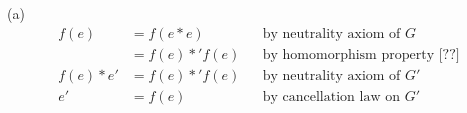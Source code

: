 
(a)
\begin{align*}
f(e) &= f(e * e)          & & \text{by neutrality axiom of $G$} \\
     &= f(e) *' f(e)      & & \text{by homomorphism property [??]} \\
f(e) * e' &= f(e) *' f(e) & & \text{by neutrality axiom of $G'$} \\
e' &= f(e)                & & \text{by cancellation law on $G'$} 
\end{align*}
